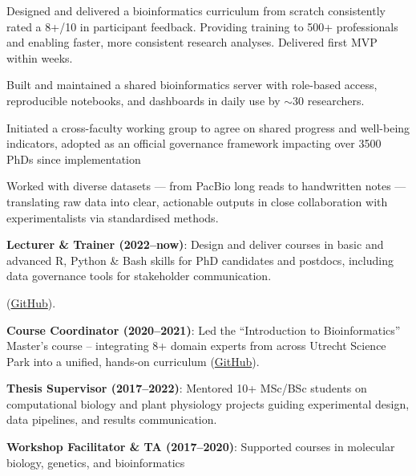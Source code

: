 \documentclass[a4paper,10pt]{article}
\begin{document}
{\begin{adjustbox}{valign=t}
\begin{minipage}[t]{0.6\textwidth}
\begin{description}
  \item Designed and delivered a bioinformatics curriculum from scratch consistently rated a 8+/10 in participant feedback.
    Providing training to 500+ professionals and enabling faster, more consistent research analyses. Delivered first MVP within weeks.
  \item Built and maintained a shared bioinformatics server with role-based access, 
  reproducible notebooks, and dashboards in daily use by $\sim$30 researchers.
  \item Initiated a cross-faculty working group to agree on shared progress and well-being indicators, 
    adopted as an official governance framework impacting over 3500 PhDs since implementation
  \item Worked with diverse datasets — from PacBio long reads to handwritten notes 
    — translating raw data into clear, actionable outputs in close collaboration with experimentalists 
    via standardised methods.
\end{description}


\end{minipage}%
\end{adjustbox}%
}
\newpage

\begin{description}
  \raggedright
  \item \textbf{Lecturer \& Trainer (2022–now)}: Design and deliver courses in 
    basic and advanced R, Python \& Bash skills for PhD candidates and postdocs, 
    including data governance tools for stakeholder communication.

    (\href{https://github.com/lauralwd/professional_education}{GitHub}).
  \item \textbf{Course Coordinator (2020–2021)}: Led the “Introduction to Bioinformatics” Master’s course 
    -- integrating 8+ domain experts 
    from across Utrecht Science Park into a unified, hands-on curriculum 
    (\href{https://lauralwd.github.io/metagenomicspractical/}{GitHub}).
  \item \textbf{Thesis Supervisor (2017–2022)}: Mentored 10+ MSc/BSc students on computational biology and 
    plant physiology projects guiding experimental design, data pipelines, and results communication.
  \item \textbf{Workshop Facilitator \& TA (2017–2020)}: Supported courses in molecular biology, genetics, and bioinformatics
\end{description}
\end{document}
